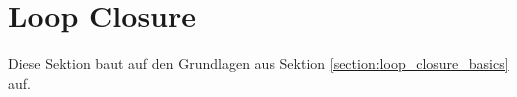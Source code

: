 \chapter{Loop Closure}

Diese Sektion baut auf den Grundlagen aus Sektion \ref{section:loop_closure_basics} auf.

